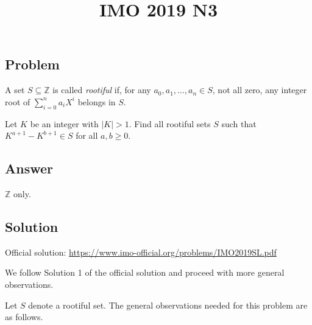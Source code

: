 \documentclass{article}
\title{IMO 2019 N3}
\author{}
\date{}
\newcommand{\Z}{\mathbb{Z}}
\begin{document}
\maketitle



\subsection*{Problem}

A set $S \subseteq \Z$ is called \emph{rootiful} if, for any $a_0, a_1, \ldots, a_n \in S$, not all zero, any integer root of $\sum_{i = 0}^n a_i X^i$ belongs in $S$.

Let $K$ be an integer with $|K| > 1$.
Find all rootiful sets $S$ such that $K^{a + 1} - K^{b + 1} \in S$ for all $a, b \geq 0$.



\subsection*{Answer}

$\Z$ only.



\subsection*{Solution}

Official solution: \url{https://www.imo-official.org/problems/IMO2019SL.pdf}

We follow Solution 1 of the official solution and proceed with more general observations.

Let $S$ denote a rootiful set.
The general observations needed for this problem are as follows.
\end{document}
